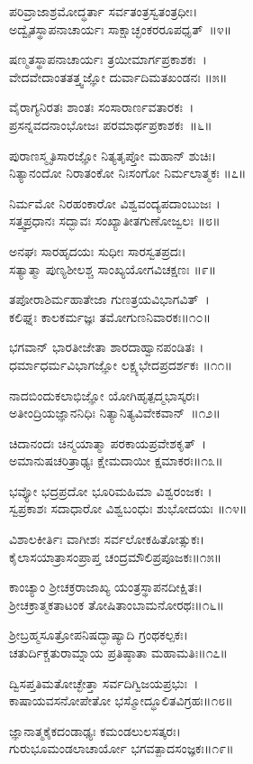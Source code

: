 ಪರಿವ್ರಾಜಾಶ್ರಮೋದ್ಧರ್ತಾ  ಸರ್ವತಂತ್ರಸ್ವತಂತ್ರಧೀಃ।\\
ಅದ್ವೈತಸ್ಥಾಪನಾಚಾರ್ಯಃ ಸಾಕ್ಷಾಚ್ಛಂಕರರೂಪಧೃತ್~॥೪॥
 
ಷಣ್ಮತಸ್ಥಾಪನಾಚಾರ್ಯಃ  ತ್ರಯೀಮಾರ್ಗಪ್ರಕಾಶಕಃ~।\\
ವೇದವೇದಾಂತತತ್ತ್ವಜ್ಞೋ ದುರ್ವಾದಿಮತಖಂಡನಃ ॥೫॥

ವೈರಾಗ್ಯನಿರತಃ ಶಾಂತಃ ಸಂಸಾರಾರ್ಣವತಾರಕಃ~।\\
ಪ್ರಸನ್ನವದನಾಂಭೋಜಃ ಪರಮಾರ್ಥಪ್ರಕಾಶಕಃ~॥೬॥

ಪುರಾಣಸ್ಮೃತಿಸಾರಜ್ಞೋ ನಿತ್ಯತೃಪ್ತೋ ಮಹಾನ್ ಶುಚಿಃ।\\
ನಿತ್ಯಾನಂದೋ ನಿರಾತಂಕೋ ನಿಃಸಂಗೋ ನಿರ್ಮಲಾತ್ಮಕಃ ॥೭॥

ನಿರ್ಮಮೋ ನಿರಹಂಕಾರೋ ವಿಶ್ವವಂದ್ಯಪದಾಂಬುಜಃ ।\\
ಸತ್ತ್ವಪ್ರಧಾನಃ ಸದ್ಭಾವಃ ಸಂಖ್ಯಾತೀತಗುಣೋಜ್ವಲಃ ॥೮॥

ಅನಘಃ ಸಾರಹೃದಯಃ ಸುಧೀಃ ಸಾರಸ್ವತಪ್ರದಃ।\\
ಸತ್ಯಾತ್ಮಾ ಪುಣ್ಯಶೀಲಶ್ಚ ಸಾಂಖ್ಯಯೋಗವಿಚಕ್ಷಣಃ ॥೯॥

ತಪೋರಾಶಿರ್ಮಹಾತೇಜಾ ಗುಣತ್ರಯವಿಭಾಗವಿತ್~।\\
ಕಲಿಘ್ನಃ ಕಾಲಕರ್ಮಜ್ಞಃ ತಮೋಗುಣನಿವಾರಕಃ॥೧೦॥

ಭಗವಾನ್ ಭಾರತೀಜೇತಾ ಶಾರದಾಹ್ವಾನಪಂಡಿತಃ ।\\
ಧರ್ಮಾಧರ್ಮವಿಭಾಗಜ್ಞೋ ಲಕ್ಷ್ಯಭೇದಪ್ರದರ್ಶಕಃ ॥೧೧॥

ನಾದಬಿಂದುಕಲಾಭಿಜ್ಞೋ ಯೋಗಿಹೃತ್ಪದ್ಮಭಾಸ್ಕರಃ।\\
ಅತೀಂದ್ರಿಯಜ್ಞಾನನಿಧಿಃ ನಿತ್ಯಾನಿತ್ಯವಿವೇಕವಾನ್~॥೧೨॥

ಚಿದಾನಂದಃ ಚಿನ್ಮಯಾತ್ಮಾ ಪರಕಾಯಪ್ರವೇಶಕೃತ್~।\\
ಅಮಾನುಷಚರಿತ್ರಾಢ್ಯಃ ಕ್ಷೇಮದಾಯೀ ಕ್ಷಮಾಕರಃ॥೧೩॥

ಭವ್ಯೋ ಭದ್ರಪ್ರದೋ ಭೂರಿಮಹಿಮಾ ವಿಶ್ವರಂಜಕಃ ।\\
ಸ್ವಪ್ರಕಾಶಃ ಸದಾಧಾರೋ  ವಿಶ್ವಬಂಧುಃ ಶುಭೋದಯಃ ॥೧೪॥

ವಿಶಾಲಕೀರ್ತಿಃ ವಾಗೀಶಃ ಸರ್ವಲೋಕಹಿತೋತ್ಸುಕಃ।\\
ಕೈಲಾಸಯಾತ್ರಾಸಂಪ್ರಾಪ್ತ ಚಂದ್ರಮೌಲಿಪ್ರಪೂಜಕಃ॥೧೫॥
 
ಕಾಂಚ್ಯಾಂ ಶ್ರೀಚಕ್ರರಾಜಾಖ್ಯ ಯಂತ್ರಸ್ಥಾಪನದೀಕ್ಷಿತಃ।\\
 ಶ್ರೀಚಕ್ರಾತ್ಮಕತಾಟಂಕ ತೋಷಿತಾಂಬಾಮನೋರಥಃ॥೧೬॥

 ಶ್ರೀಬ್ರಹ್ಮಸೂತ್ರೋಪನಿಷದ್ಭಾಷ್ಯಾದಿ ಗ್ರಂಥಕಲ್ಪಕಃ।\\
ಚತುರ್ದಿಕ್ಚತುರಾಮ್ನಾಯ ಪ್ರತಿಷ್ಠಾತಾ ಮಹಾಮತಿಃ॥೧೭॥

ದ್ವಿಸಪ್ತತಿಮತೋಚ್ಛೇತ್ತಾ ಸರ್ವದಿಗ್ವಿಜಯಪ್ರಭುಃ~।\\
ಕಾಷಾಯವಸನೋಪೇತೋ ಭಸ್ಮೋದ್ಧೂಲಿತವಿಗ್ರಹಃ॥೧೮॥

ಜ್ಞಾನಾತ್ಮಕೈಕದಂಡಾಢ್ಯಃ ಕಮಂಡಲುಲಸತ್ಕರಃ।\\
ಗುರುಭೂಮಂಡಲಾಚಾರ್ಯೋ ಭಗವತ್ಪಾದಸಂಜ್ಞಕಃ॥೧೯॥

